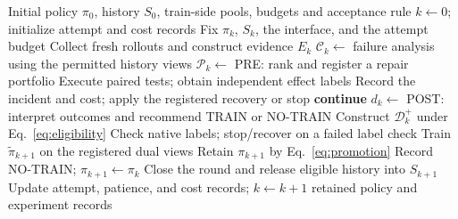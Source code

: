 \begin{algorithm}[H]
\caption{RePair research and policy-update procedure}
\label{alg:repair}
\begin{algorithmic}[1]
\Require Initial policy $\pi_0$, history $S_0$, train-side pools, budgets and acceptance rule
\State $k\gets0$; initialize attempt and cost records
  \State Fix $\pi_k$, $S_k$, the interface, and the attempt budget
  \State Collect fresh rollouts and construct evidence $E_k$
  \State $\mathcal C_k\gets$ failure analysis using the permitted history views
  \State $\mathcal P_k\gets$ PRE: rank and register a repair portfolio
  \State Execute paired tests; obtain independent effect labels
    \State Record the incident and cost; apply the registered recovery or stop
    \State \textbf{continue}
  \EndIf
  \State $d_k\gets$ POST: interpret outcomes and recommend TRAIN or NO-TRAIN
  \State Construct $\mathcal D_k^+$ under Eq.~\eqref{eq:eligibility}
    \State Check native labels; stop/recover on a failed label check
    \State Train $\widetilde\pi_{k+1}$ on the registered dual views
    \State Retain $\pi_{k+1}$ by Eq.~\eqref{eq:promotion}
  \Else
    \State Record NO-TRAIN; $\pi_{k+1}\gets\pi_k$
  \EndIf
  \State Close the round and release eligible history into $S_{k+1}$
  \State Update attempt, patience, and cost records; $k\gets k+1$
\EndWhile
\State \Return retained policy and experiment records
\end{algorithmic}
\end{algorithm}
